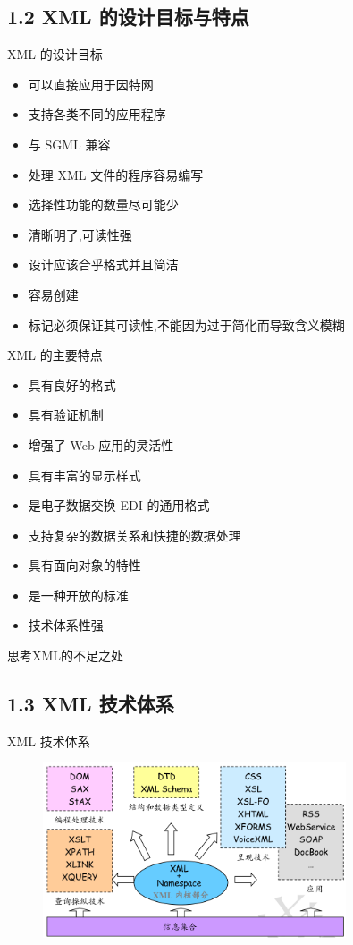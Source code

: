 \subsection{1.2 XML 的设计目标与特点}


\begin{frame}{XML 的设计目标}
\begin{itemize} 
\item 可以直接应用于因特网
\item 支持各类不同的应用程序
\item 与 SGML 兼容
\item 处理 XML 文件的程序容易编写
\item 选择性功能的数量尽可能少
\item 清晰明了,可读性强
\item 设计应该合乎格式并且简洁
\item 容易创建
\item 标记必须保证其可读性,不能因为过于简化而导致含义模糊
\end{itemize}
\end{frame}


\begin{frame}{XML 的主要特点}
\begin{itemize} 
\item 具有良好的格式
\item 具有验证机制
\item 增强了 Web 应用的灵活性
\item 具有丰富的显示样式
\item 是电子数据交换 EDI 的通用格式
\item 支持复杂的数据关系和快捷的数据处理
\item 具有面向对象的特性
\item 是一种开放的标准
\item 技术体系性强
\end{itemize}

\par 思考XML的不足之处
\end{frame}


\subsection{1.3 XML 技术体系}
\begin{frame}[fragile]{ XML 技术体系}
\begin{figure}
	\includegraphics[width=0.8\textwidth]{figure/intro-2.png}
\end{figure}
\end{frame}


